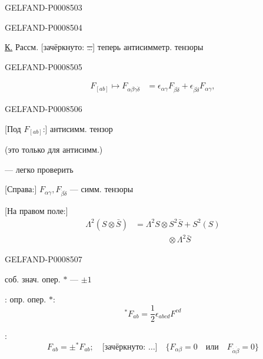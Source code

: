 \begin{GelfandAdjacentEvidence}{GELFAND-P000850}{3}

\end{GelfandAdjacentEvidence}
\begin{GelfandAdjacentEvidence}{GELFAND-P000850}{4}


\uline{К.} Рассм. [зачёркнуто: \sout{…}] теперь антисимметр. тензоры
\end{GelfandAdjacentEvidence}
\begin{GelfandAdjacentEvidence}{GELFAND-P000850}{5}

\[
\begin{aligned}
F_{[ab]}\longmapsto F_{\alpha\beta\dot\gamma\dot\delta}
&=\epsilon_{\alpha\gamma}F_{\dot\beta\dot\delta}
+\epsilon_{\dot\beta\dot\delta}F_{\alpha\gamma},
\end{aligned} \tag{10}
\]
\end{GelfandAdjacentEvidence}
\begin{GelfandAdjacentEvidence}{GELFAND-P000850}{6}


[Под \(F_{[ab]}\):] антисимм. тензор

(это только для антисимм.)

— легко проверить

[Справа:] \(F_{\alpha\gamma},F_{\dot\beta\dot\delta}\) — симм. тензоры

[На правом поле:]
\[
\begin{aligned}
\Lambda^2(S\otimes\bar S)&=\Lambda^2S\otimes S^2\bar S+S^2(S)\\
 &\qquad\qquad\otimes\Lambda^2\bar S
\end{aligned} \tag{*}
\]
\end{GelfandAdjacentEvidence}
\begin{GelfandAdjacentEvidence}{GELFAND-P000850}{7}

соб. знач. опер. \(*\) — \(\pm1\)

: опр. опер. \(*\):
\[
{}^*F_{ab}=\frac12\epsilon_{abcd}F^{cd} \tag{11}
\]

:
\[
F_{ab}=\pm{}^*F_{ab};\quad
\text{[зачёркнуто: …]}\quad
\{F_{\alpha\beta}=0\quad\text{или}\quad F_{\dot\alpha\dot\beta}=0\} \tag{12}
\]
\end{GelfandAdjacentEvidence}
